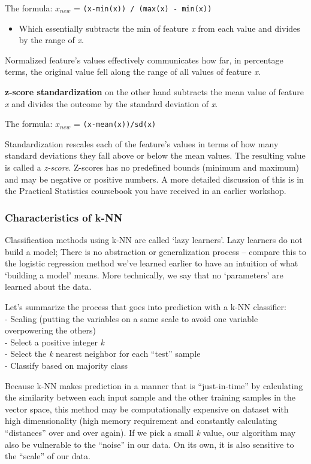 \documentclass[
]{article}
\providecommand{\tightlist}{%
  \setlength{\itemsep}{0pt}\setlength{\parskip}{0pt}}
\begin{document}
The formula: \(x_{new}\) = \texttt{(x-min(x))\ /\ (max(x)\ -\ min(x))}

\begin{itemize}
\tightlist
\item
  Which essentially subtracts the min of feature \emph{x} from each
  value and divides by the range of \emph{x}.
\end{itemize}

Normalized feature's values effectively communicates how far, in
percentage terms, the original value fell along the range of all values
of feature \emph{x}.

\textbf{z-score standardization} on the other hand subtracts the mean
value of feature \emph{x} and divides the outcome by the standard
deviation of \emph{x}.

The formula: \(x_{new}\) = \texttt{(x-mean(x))/sd(x)}

Standardization rescales each of the feature's values in terms of how
many standard deviations they fall above or below the mean values. The
resulting value is called a \emph{z-score}. Z-scores has no predefined
bounds (minimum and maximum) and may be negative or positive numbers. A
more detailed discussion of this is in the Practical Statistics
coursebook you have received in an earlier workshop.

\hypertarget{characteristics-of-k-nn}{%
\subsubsection{Characteristics of k-NN}\label{characteristics-of-k-nn}}

Classification methods using k-NN are called `lazy learners'. Lazy
learners do not build a model; There is no abstraction or generalization
process -- compare this to the logistic regression method we've learned
earlier to have an intuition of what `building a model' means. More
technically, we say that no `parameters' are learned about the data.

Let's summarize the process that goes into prediction with a k-NN
classifier:\\
- Scaling (putting the variables on a same scale to avoid one variable
overpowering the others)\\
- Select a positive integer \emph{k}\\
- Select the \emph{k} nearest neighbor for each ``test'' sample\\
- Classify based on majority class

Because k-NN makes prediction in a manner that is ``just-in-time'' by
calculating the similarity between each input sample and the other
training samples in the vector space, this method may be computationally
expensive on dataset with high dimensionality (high memory requirement
and constantly calculating ``distances'' over and over again). If we
pick a small \emph{k} value, our algorithm may also be vulnerable to the
``noise'' in our data. On its own, it is also sensitive to the ``scale''
of our data.
\end{document}
